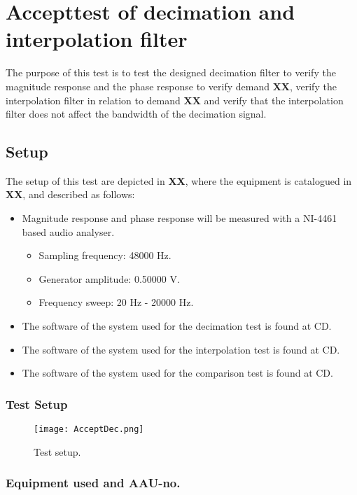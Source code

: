 \chapter{Accepttest of decimation and interpolation filter}\label{app:journal_decimationFilter}
The purpose of this test is to test the designed decimation filter to verify the magnitude response and the phase response to verify demand \textbf{XX}, verify the interpolation filter in relation to demand \textbf{XX} and verify that the interpolation filter does not affect the bandwidth of the decimation signal.

\section{Setup}
The setup of this test are depicted in \textbf{XX}, where the equipment is catalogued in \textbf{XX}, and described as follows:

\begin{itemize}
\item Magnitude response and phase response will be measured with a NI-4461 based audio analyser. 
\begin{itemize}
\item Sampling frequency: 48000 Hz.
\item Generator amplitude: 0.50000 V.
\item Frequency sweep: 20 Hz - 20000 Hz.
\end{itemize}
\item The software of the system used for the  decimation test is found at CD. 
\item The software of the system used for the  interpolation test is found at CD. 
\item The software of the system used for the  comparison test is found at CD. 
\end{itemize}


\subsection*{Test Setup}
\begin{figure}[H]
\centering
\texttt{[image: AcceptDec.png]}
\label{fig:AcceptDec}
\caption{Test setup.}
\end{figure}

\subsection*{Equipment used and AAU-no.}

